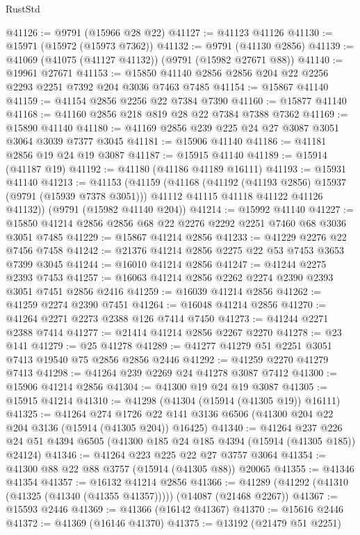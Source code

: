 \begin{lexlean}{RustStd}
\begin{coremodule}
@41126 := @9791 (@15966 @28 @22)
@41127 := @41123 @41126
@41130 := @15971 (@15972 (@15973 @7362))
@41132 := @9791 (@41130 @2856)
@41139 := @41069 (@41075 (@41127 @41132)) (@9791 (@15982 @27671 @88))
@41140 := @19961 @27671
@41153 := @15850 @41140 @2856 @2856 @204 @22 @2256 @2293 @2251 @7392 @204 @3036 @7463 @7485
@41154 := @15867 @41140
@41159 := @41154 @2856 @2256 @22 @7384 @7390
@41160 := @15877 @41140
@41168 := @41160 @2856 @218 @819 @28 @22 @7384 @7388 @7362
@41169 := @15890 @41140
@41180 := @41169 @2856 @239 @225 @24 @27 @3087 @3051 @3064 @3039 @7377 @3045
@41181 := @15906 @41140
@41186 := @41181 @2856 @19 @24 @19 @3087
@41187 := @15915 @41140
@41189 := @15914 (@41187 @19)
@41192 := @41180 (@41186 @41189 @16111)
@41193 := @15931 @41140
@41213 := @41153
    (@41159
      (@41168
        (@41192 (@41193 @2856) @15937 (@9791 (@15939 @7378 @3051)))
        @41112
        @41115
        @41118
        @41122
        @41126
        @41132))
    (@9791 (@15982 @41140 @204))
@41214 := @15992 @41140
@41227 := @15850 @41214 @2856 @2856 @68 @22 @2276 @2292 @2251 @7460 @68 @3036 @3051 @7485
@41229 := @15867 @41214 @2856
@41233 := @41229 @2276 @22 @7456 @7458
@41242 := @21376 @41214 @2856 @2275 @22 @53 @7453 @3653 @7399 @3045
@41244 := @16010 @41214 @2856
@41247 := @41244 @2275 @2393 @7453
@41257 := @16063 @41214 @2856 @2262 @2274 @2390 @2393 @3051 @7451 @2856 @2416
@41259 := @16039 @41214 @2856
@41262 := @41259 @2274 @2390 @7451
@41264 := @16048 @41214 @2856
@41270 := @41264 @2271 @2273 @2388 @126 @7414 @7450
@41273 := @41244 @2271 @2388 @7414
@41277 := @21414 @41214 @2856 @2267 @2270
@41278 := @23 @141
@41279 := @25 @41278
@41289 := @41277 @41279 @51 @2251 @3051 @7413 @19540 @75 @2856 @2856 @2446
@41292 := @41259 @2270 @41279 @7413
@41298 := @41264 @239 @2269 @24 @41278 @3087 @7412
@41300 := @15906 @41214 @2856
@41304 := @41300 @19 @24 @19 @3087
@41305 := @15915 @41214
@41310 := @41298 (@41304 (@15914 (@41305 @19)) @16111)
@41325 := @41264
    @274
    @1726
    @22
    @141
    @3136
    @6506
    (@41300 @204 @22 @204 @3136 (@15914 (@41305 @204)) @16425)
@41340 := @41264
    @237
    @226
    @24
    @51
    @4394
    @6505
    (@41300 @185 @24 @185 @4394 (@15914 (@41305 @185)) @24124)
@41346 := @41264 @223 @225 @22 @27 @3757 @3064
@41354 := @41300 @88 @22 @88 @3757 (@15914 (@41305 @88)) @20065
@41355 := @41346 @41354
@41357 := @16132 @41214 @2856
@41366 := @41289 (@41292 (@41310 (@41325 (@41340 (@41355 @41357))))) (@14087 (@21468 @2267))
@41367 := @15593 @2446
@41369 := @41366 (@16142 @41367)
@41370 := @15616 @2446
@41372 := @41369 (@16146 @41370)
@41375 := @13192 (@21479 @51 @2251)

\end{coremodule}
\end{lexlean}
